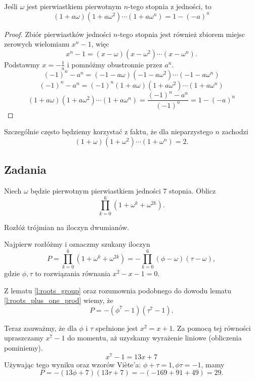 \documentclass{scrartcl}
\begin{document}
    \begin{lemma}
        \label{l:roots_plus_one_prod}
        Jeśli $\omega$ jest pierwiastkiem pierwotnym $n$-tego stopnia z jedności, to
        $$ (1 + a\omega)(1 + a\omega^2)\cdots(1 + a\omega^n) = 1 - (-a)^n $$
    \end{lemma}
    \begin{proof}
        Zbiór pierwiastków jedności $n$-tego stopnia jest również zbiorem miejsc zerowych wielomianu $x^n - 1$, więc
        $$ x^n - 1 = (x - \omega)(x - \omega^2)\cdots(x - \omega^n). $$
        Podstawmy $x = -\frac{1}{a}$ i pomnóżmy obustronnie przez $a^n$.
        $$ (-1)^n - a^n = (-1 - a\omega)(-1 - a\omega^2)\cdots(-1 - a\omega^n) $$
        $$ (-1)^n - a^n = (-1)^n(1 + a\omega)(1 + a\omega^2)\cdots(1 + a\omega^n) $$
        $$ (1 + a\omega)(1 + a\omega^2)\cdots(1 + a\omega^n) = \frac{(-1)^n - a^n}{(-1)^n} = 1 - (-a)^n $$
    \end{proof}

    Szczególnie często będziemy korzystać z faktu, że dla nieparzystego $n$ zachodzi
    $$ (1 + \omega)(1 + \omega^2)\cdots(1 + \omega^n) = 2. $$

    \subsection{Zadania}
    \begin{problem}
        Niech $\omega$ będzie pierwotnym pierwiastkiem jedności $7$ stopnia. Oblicz
        $$ \prod_{k = 0}^6(1 + \omega^k + \omega^{2k}). $$
        \begin{hint}
            Rozłóż trójmian na iloczyn dwumianów.
        \end{hint}
        \begin{answer}
            Najpierw rozłóżmy i oznaczmy szukany iloczyn
            $$ P = \prod_{k = 0}^6(1 + \omega^k + \omega^{2k}) = -\prod_{k = 0}^6(\phi - \omega)(\tau - \omega), $$
            gdzie $\phi, \tau$ to rozwiązania równania $x^2 - x - 1 = 0$.

            Z lematu \ref{l:roots_group} oraz rozumownia podobnego do dowodu lematu \ref{l:roots_plus_one_prod} wiemy, że
            $$ P = -(\phi^7 - 1)(\tau^7 - 1). $$

            Teraz zauważmy, że dla $\phi$ i $\tau$ spełnione jest $x^2 = x + 1$. Za pomocą tej równości upraszczamy $x^7 - 1$ do momentu, aż uzyskamy wyrażenie liniowe (obliczenia pominiemy).
            $$ x^7 - 1 = 13x + 7 $$
            Używając tego wyniku oraz wzorów Viète'a: $\phi + \tau = 1, \phi\tau = -1$, mamy
            $$ P = -(13\phi + 7)(13\tau + 7) = -(-169 + 91 + 49) = 29. $$
        \end{answer}
    \end{problem}
\end{document}
